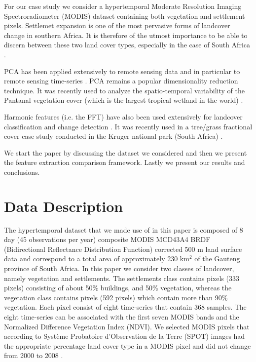 \documentclass{article}
\begin{document}
For our case study we consider a hypertemporal Moderate Resolution Imaging Spectroradiometer (MODIS) dataset containing both vegetation and settlement pixels.
Settlemet expansion is one of the most pervasive forms of landcover change in southern Africa. It is therefore of the utmost importance to be able to discern 
between these two land cover types, especially in the case of South Africa \cite{grobler2012}. 

PCA has been applied extensively to remote sensing data \cite{byrne1980} and in particular to remote sensing time-series \cite{hall2003}. PCA remains a popular dimensionality reduction technique. It was recently used to analyze the spatio-temporal variability of 
the Pantanal vegetation cover (which is the largest tropical wetland in the world) \cite{almeida2015}.  %

Harmonic features (i.e. the FFT) have also been used extensively for landcover classification and change detection \cite{jakubauskas2002}. It was recently used in a tree/grass fractional cover case study conducted in 
the Kruger national park (South Africa) \cite{ibrahim2018}.

We start the paper by discussing the dataset we considered and then we present the feature extraction comparison framework. Lastly we present our results and conclusions.

\section{Data Description}
\label{sec:data}
The hypertemporal dataset that we made use of in this paper is composed of 8 day (45 observations per year) composite MODIS MCD43A4 BRDF (Bidirectional Reflectance Distribution Function) corrected 500 m land surface
data and correspond to a total area of approximately 230 km$^2$ of the Gauteng province of South Africa. In this paper we consider two classes of landcover, namely vegetation and settlements. The settlements class contains pixels (333 pixels) consisting of about
50\% buildings, and 50\% vegetation, whereas the vegetation class contains pixels (592 pixels) which contain more than 90\% vegetation. Each pixel consist of eight time-series that contain 368 samples. The eight time-series can be associated with the first seven MODIS bands and the Normalized Difference Vegetation Index (NDVI).
We selected MODIS pixels that according to Système Probatoire d’Observation de la Terre (SPOT) images had the appropriate percentage land cover type in a MODIS pixel and did not change from 2000 to 2008 \cite{grobler2012}.
\end{document}
